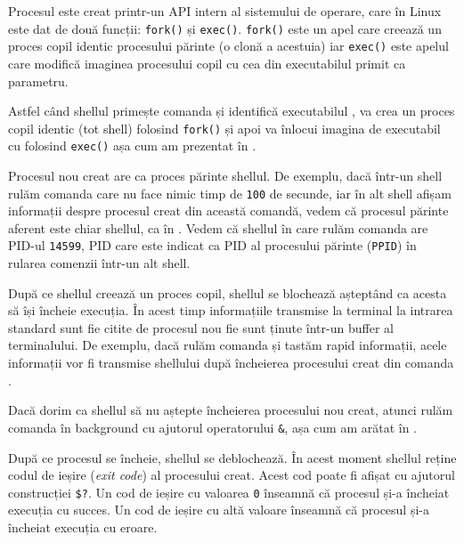 Procesul este creat printr-un API intern al sistemului de operare, care în Linux este dat de două funcții: \texttt{fork()} și \texttt{exec()}.
\texttt{fork()} este un apel care creează un proces copil identic procesului părinte (o clonă a acestuia) iar \texttt{exec()} este apelul care modifică imaginea procesului copil cu cea din executabilul primit ca parametru.

Astfel când shellul primește comanda  și identifică executabilul , va crea un proces copil identic (tot shell) folosind \texttt{fork()} și apoi va înlocui imagina de executabil cu  folosind \texttt{exec()} așa cum am prezentat în .

Procesul nou creat are ca proces părinte shellul.
De exemplu, dacă într-un shell rulăm comanda  care nu face nimic timp de \texttt{100} de secunde, iar în alt shell afișam informații despre procesul creat din această comandă, vedem că procesul părinte aferent este chiar shellul, ca în .
Vedem că shellul în care rulăm comanda  are PID-ul \texttt{14599}, PID care este indicat ca PID al procesului părinte (\texttt{PPID}) în rularea comenzii  într-un alt shell.


După ce shellul creează un proces copil, shellul se blochează așteptând ca acesta să își încheie execuția.
În acest timp informațiile transmise la terminal la intrarea standard sunt fie citite de procesul nou fie sunt ținute într-un buffer al terminalului.
De exemplu, dacă rulăm comanda  și tastăm rapid informații, acele informații vor fi transmise shellului după încheierea procesului creat din comanda .

Dacă dorim ca shellul să nu aștepte încheierea procesului nou creat, atunci rulăm comanda în background cu ajutorul operatorului \texttt{\&}, așa cum am arătat în .

După ce procesul se încheie, shellul se deblochează.
În acest moment shellul reține codul de ieșire (\textit{exit code}) al procesului creat.
Acest cod poate fi afișat cu ajutorul construcției \texttt{\$?}.
Un cod de ieșire cu valoarea \texttt{0} înseamnă că procesul și-a încheiat execuția cu succes.
Un cod de ieșire cu altă valoare înseamnă că procesul și-a încheiat execuția cu eroare.

